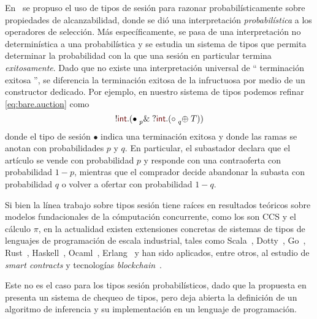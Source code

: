 \documentclass{article}
\newcommand{\mktype}[1]{\mathsf{\color{myred}#1}}
\newcommand{\tint}{\mktype{int}}
\newcommand{\parens}[1]{(#1)}
\newcommand{\tdone}{{\bullet}}
\newcommand{\tend}{{\circ}}
\newcommand{\cin}[2][.]{{?}#2#1}
\newcommand{\cout}[2][.]{{!}#2#1}
\newcommand{\xpoint}[3]{#1 \mathrel{#2} #3}
\newcommand{\tbranch}[3][p]{\xpoint{#2}{\prescript{}{#1}{\&}}{#3}}
\newcommand{\tchoice}[3][p]{\xpoint{#2}{\prescript{}{#1}{\oplus}}{#3}}
\newcommand{\T}{T}
\begin{document}
En~\cite{DBLP:conf/concur/InversoMPTT20} se propuso el uso de tipos de sesi\'on para
razonar probabil\'isticamente sobre propiedades de alcanzabilidad, donde se di\'o
 una interpretaci\'on
\emph{probabil\'istica} a los operadores de selecci\'on. M\'as específicamente, se pasa 
 de una interpretación no determin\'istica a una probabilística y se 
 estudia un sistema de tipos que permita determinar la probabilidad con la que una sesi\'on en particular
termina \emph{exitosamente}. Dado que no existe una interpretaci\'on universal
 de `` terminación exitosa '', se diferencia la terminaci\'on exitosa de la 
 infructuosa  por medio de un
  {constructor dedicado}.
%
Por ejemplo, en nuestro sistema de tipos podemos refinar
\eqref{eq:bare.auction} como
\begin{equation}
  \label{eq:refined.auction}
  \cout\tint\parens{
    \tbranch[p]\tdone{
      \cin\tint\parens{
        \tchoice[q]\tend\T
      }
    }
  }
\end{equation}
donde el tipo de sesión $\tdone$ indica una terminación exitosa y donde las
ramas  se anotan con probabilidades $p$ y
$q$. En particular, el subastador declara que el artículo se vende con
probabilidad $p$ y  responde con una contraoferta con probabilidad
$1-p$, mientras que el comprador decide abandonar la subasta con
probabilidad $q$ o volver a ofertar  con probabilidad $1-q$.

Si bien la l\'inea trabajo sobre tipos sesi\'on tiene ra\'ices en resultados te\'oricos
sobre modelos fundacionales de la c\'omputaci\'on concurrente, como
los son CCS y el c\'alculo $\pi$, en la actualidad existen extensiones
concretas de sistemas de tipos de lenguajes de programaci\'on de
escala industrial, tales como Scala~\cite{DBLP:conf/pldi/ScalasYB19}, Dotty~\cite{DBLP:conf/pldi/ScalasYB19}, Go~\cite{DBLP:conf/icse/LangeNTY18,DBLP:conf/icse/LangeNTY18}, Rust~\cite{DBLP:journals/corr/abs-1909-05970,DBLP:conf/coordination/LagaillardieNY20}, Haskell~\cite{orchard2017session,DBLP:conf/haskell/LindleyM16}, 
Ocaml~\cite{DBLP:journals/jfp/Padovani17,DBLP:conf/coordination/LagaillardieNY20,DBLP:conf/ecoop/ImaiNYY19}, Erlang~\cite{fowler2016erlang} y han sido aplicados, entre otros, 
al estudio de  {\em smart contracts} y tecnolog\'ias {\em blockchain}~\cite{10.1145/3417516,DBLP:journals/corr/abs-1902-06056}. 

Este no es el caso para los tipos sesi\'on probabil\'isticos, dado que
 la propuesta en~\cite{DBLP:conf/concur/InversoMPTT20} presenta un sistema de chequeo 
de tipos, pero deja abierta la definici\'on de un algoritmo de inferencia y su implementaci\'on 
en un lenguaje de programaci\'on.
\end{document}
